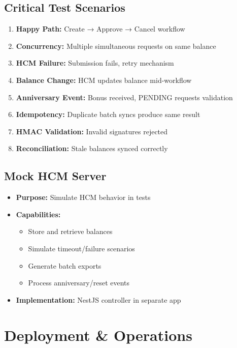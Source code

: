 \documentclass[12pt,a4paper]{article}
\begin{document}
\subsection{Critical Test Scenarios}

\begin{enumerate}
    \item \textbf{Happy Path:} Create → Approve → Cancel workflow
    \item \textbf{Concurrency:} Multiple simultaneous requests on same balance
    \item \textbf{HCM Failure:} Submission fails, retry mechanism
    \item \textbf{Balance Change:} HCM updates balance mid-workflow
    \item \textbf{Anniversary Event:} Bonus received, PENDING requests validation
    \item \textbf{Idempotency:} Duplicate batch syncs produce same result
    \item \textbf{HMAC Validation:} Invalid signatures rejected
    \item \textbf{Reconciliation:} Stale balances synced correctly
\end{enumerate}

\subsection{Mock HCM Server}

\begin{itemize}
    \item \textbf{Purpose:} Simulate HCM behavior in tests
    \item \textbf{Capabilities:}
    \begin{itemize}
        \item Store and retrieve balances
        \item Simulate timeout/failure scenarios
        \item Generate batch exports
        \item Process anniversary/reset events
    \end{itemize}
    \item \textbf{Implementation:} NestJS controller in separate app
\end{itemize}

\newpage

\section{Deployment \& Operations}
\end{document}
